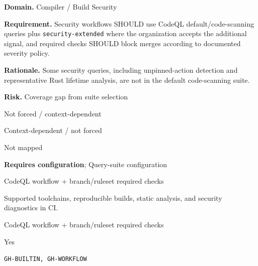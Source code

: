 \documentclass[10pt,letterpaper]{article}
\newcommand{\code}[1]{\texttt{\small #1}}
\newcommand{\prioritybadge}[2]{\tcbox[on line,boxrule=0pt,arc=1.2mm,boxsep=0.7mm,left=1mm,right=1mm,top=0.4mm,bottom=0.4mm,colback=#2!12,coltext=#2]{\scriptsize\bfseries #1}}
\begin{document}
\begin{rulebox}[title={\texttt{SCS-ACTIONS-BUILD-001} \hfill \prioritybadge{High Priority}{High}}]
\textbf{Domain.} Compiler / Build Security

\textbf{Requirement.} Security workflows SHOULD use CodeQL default/code-scanning queries plus \code{security-extended} where the organization accepts the additional signal, and required checks SHOULD block merges according to documented severity policy.

\textbf{Rationale.} Some security queries, including unpinned-action detection and representative Rust lifetime analysis, are not in the default code-scanning suite.

\textbf{Risk.} Coverage gap from suite selection

\begin{description}[leftmargin=2.65cm,labelwidth=2.3cm,style=nextline,itemsep=1pt,topsep=3pt]
  \item[CWE] Not forced / context-dependent
  \item[OWASP] Context-dependent / not forced
  \item[CERT] Not mapped
  \item[CodeQL] \textbf{Requires configuration}; Query-suite configuration
  \item[Enforcement] CodeQL workflow + branch/ruleset required checks
  \item[Prevention] Supported toolchains, reproducible builds, static analysis, and security diagnostics in CI.
  \item[Verification] CodeQL workflow + branch/ruleset required checks
  \item[Automation] Yes
  \item[Sources] \texttt{GH-BUILTIN, GH-WORKFLOW}
\end{description}
\end{rulebox}
\end{document}
